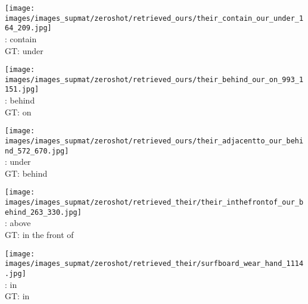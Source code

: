 \documentclass[10pt,twocolumn,letterpaper]{article}
\begin{document}
\begin{figure*}[t]
\begin{minipage}[t]{0.185\textwidth}
    	\centering
       	\texttt{[image: images/images\_supmat/zeroshot/retrieved\_ours/their\_contain\_our\_under\_164\_209.jpg]}\\
       	\vspace{0.3ex}
       	\cite{Lu16}: contain \\
       	GT: under
       	\vspace{2ex}
    \end{minipage}
    \hspace{0.005\textwidth}
\begin{minipage}[t]{0.185\textwidth}
    	\centering
       	\texttt{[image: images/images\_supmat/zeroshot/retrieved\_ours/their\_behind\_our\_on\_993\_1151.jpg]}\\
       	\vspace{0.3ex}
       	\cite{Lu16}: behind \\
       	GT: on
       	\vspace{0.2ex}
    \end{minipage}
    \hspace{0.005\textwidth}
\begin{minipage}[t]{0.185\textwidth}
    	\centering
       	\texttt{[image: images/images\_supmat/zeroshot/retrieved\_ours/their\_adjacentto\_our\_behind\_572\_670.jpg]}\\
		\vspace{0.3ex}       	
       	\cite{Lu16}: under \\
       	GT: behind
       	\vspace{0.2ex}
    \end{minipage}
    \hspace{0.005\textwidth}
\begin{minipage}[t]{0.185\textwidth}
    	\centering
       	\texttt{[image: images/images\_supmat/zeroshot/retrieved\_their/their\_inthefrontof\_our\_behind\_263\_330.jpg]}\\
		\vspace{0.3ex}       	
       	\cite{Lu16}: above \\
       	GT: in the front of
       	\vspace{0.2ex}
    \end{minipage}
    \hspace{0.005\textwidth}  
\begin{minipage}[t]{0.185\textwidth}
    	\centering
       	\texttt{[image: images/images\_supmat/zeroshot/retrieved\_their/surfboard\_wear\_hand\_1114.jpg]}\\
		\vspace{0.3ex}       	
       	\cite{Lu16}: in \\
       	GT: in
      	\vspace{0.2ex}
    \end{minipage} 


\end{figure*}
\end{document}
